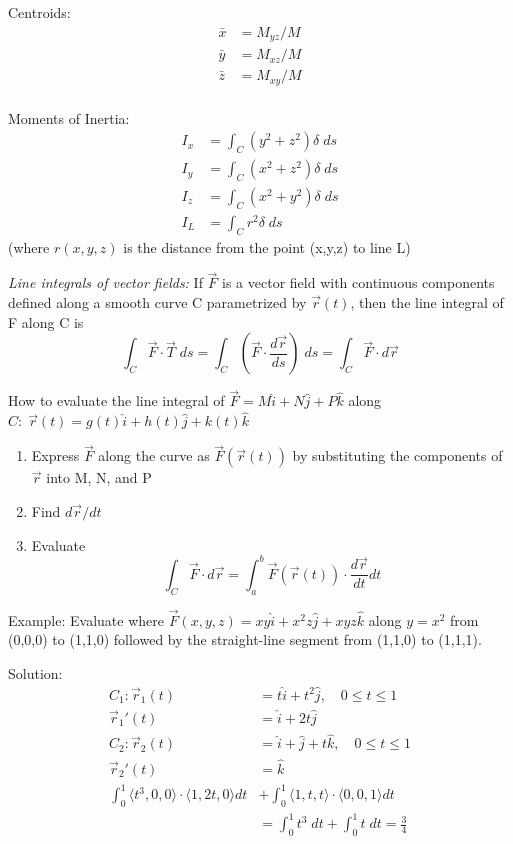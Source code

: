 \documentclass[12pt]{article}
\begin{document}
Centroids: 
\begin{align*}
    \bar{x} &= M_{yz} / M\\
    \bar{y} &= M_{xz} / M\\
    \bar{z} &= M_{xy} / M\\
\end{align*}

Moments of Inertia:
\begin{align*}
    I_x &= \int_C (y^2 + z^2) \delta \; ds\\
    I_y &= \int_C (x^2 + z^2) \delta \; ds\\
    I_z &= \int_C (x^2 + y^2) \delta \; ds\\
    I_L &= \int_C r^2 \delta \; ds 
\end{align*}
(where $r(x,y,z)$ is the distance from the point (x,y,z) to line L)


\emph{Line integrals of vector fields:}
If $\vec{F}$ is a vector field with continuous components defined along a smooth curve C parametrized by $\vec{r}(t)$, then the line integral of F along C is 
\[\int_C \vec{F} \cdot \vec{T} \; ds = \int_C \left(\vec{F} \cdot \frac{d\vec{r}}{ds}\right) \; ds = \int_C \vec{F} \cdot d\vec{r}\]

How to evaluate the line integral of $\vec{F} = M \hat{i} + N \hat{j} + P \hat{k}$ along $C: \; \vec{r}(t) = g(t) \hat{i} + h(t) \hat{j} + k(t) \hat{k}$
\begin{enumerate}
    \item Express $\vec{F}$ along the curve as $\vec{F}(\vec{r}(t))$ by substituting the components of $\vec{r}$ into M, N, and P
    \item Find $d\vec{r} / dt$ 
    \item Evaluate
    \[\int_C \vec{F} \cdot d\vec{r} = \int_a^b \vec{F}(\vec{r}(t)) \cdot \frac{d\vec{r}}{dt} dt\]
\end{enumerate}

Example: Evaluate where $\vec{F}(x,y,z) = xy\hat{i} + x^2z\hat{j} + xyz \hat{k}$ along $y=x^2$ from (0,0,0) to (1,1,0) followed by the straight-line segment from (1,1,0) to (1,1,1).

Solution:
\begin{align*}
    C_1: \vec{r}_1(t) &= t\hat{i} + t^2 \hat{j}, \quad 0 \leq t\leq 1\\
    \vec{r}_1'(t) &= \hat{i} + 2t \hat{j}\\
    C_2: \vec{r}_2(t) &= \hat{i} + \hat{j} + t\hat{k}, \quad 0 \leq t\leq 1\\
    \vec{r}_2'(t) &= \hat{k}\\
    \int_0^1 \langle t^3, 0,0\rangle \cdot \langle 1, 2t, 0 \rangle dt &+ \int_0^1 \langle 1, t, t\rangle \cdot \langle 0, 0,1\rangle dt \\
    &= \int_0^1 t^3 \; dt + \int_0^1 t \; dt = \frac{3}{4}
\end{align*}
\end{document}

